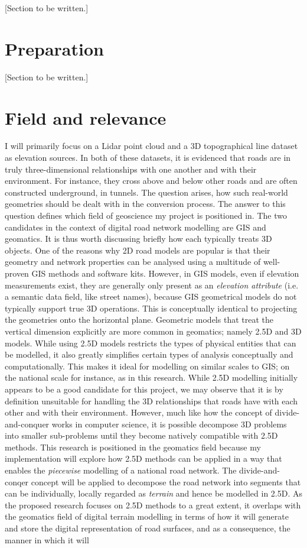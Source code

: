 [Section to be written.]

\section{Preparation}
\label{sec:prep}

[Section to be written.]

\section{Field and relevance}

I will primarily focus on a Lidar point cloud and a 3D topographical line dataset as elevation sources. In both of these datasets, it is evidenced that roads are in truly three-dimensional relationships with one another and with their environment. For instance, they cross above and below other roads and are often constructed underground, in tunnels. The question arises, how such real-world geometries should be dealt with in the conversion process. The answer to this question defines which field of geoscience my project is positioned in. The two candidates in the context of digital road network modelling are GIS and geomatics. It is thus worth discussing briefly how each typically treats 3D objects. One of the reasons why 2D road models are popular is that their geometry and network properties can be analysed using a multitude of well-proven GIS methods and software kits. However, in GIS models, even if elevation measurements exist, they are generally only present as an \textit{elevation attribute} (i.e. a semantic data field, like street names), because GIS geometrical models do not typically support true 3D operations. This is conceptually identical to projecting the geometries onto the horizontal plane. Geometric models that treat the vertical dimension explicitly are more common in geomatics; namely 2.5D and 3D models. While using 2.5D models restricts the types of physical entities that can be modelled, it also greatly simplifies certain types of analysis conceptually and computationally. This makes it ideal for modelling on similar scales to GIS; on the national scale for instance, as in this research. While 2.5D modelling initially appears to be a good candidate for this project, we may observe that it is by definition unsuitable for handling the 3D relationships that roads have with each other and with their environment. However, much like how the concept of divide-and-conquer works in computer science, it is possible decompose 3D problems into smaller sub-problems until they become natively compatible with 2.5D methods. This research is positioned in the geomatics field because my implementation will explore how 2.5D methods can be applied in a way that enables the \textit{piecewise} modelling of a national road network. The divide-and-conqer concept will be applied to decompose the road network into segments that can be individually, locally regarded as \textit{terrain} and hence be modelled in 2.5D. As the proposed research focuses on 2.5D methods to a great extent, it overlaps with the geomatics field of digital terrain modelling in terms of how it will generate and store the digital representation of road surfaces, and as a consequence, the manner in which it will 
